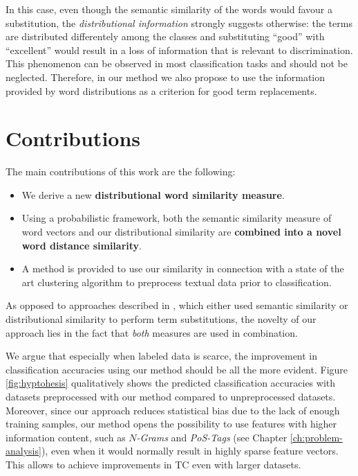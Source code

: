 In this case, even though the semantic similarity of the words would favour a
substitution, the \emph{distributional information} strongly suggests otherwise:
the terms are distributed differentely among the classes and substituting ``good'' with
``excellent'' would result in a loss of information that is relevant to 
discrimination. 
This phenomenon can be observed in most classification tasks and
should not be neglected. Therefore, in our method we also propose to use 
the information provided by word distributions as a criterion for good term 
replacements. 

\section{Contributions}
\label{sec:contributions}
The main contributions of this work are the following:

\begin{itemize}
  \item We derive a new \textbf{distributional word similarity measure}.
   
  \item Using a probabilistic framework, both the semantic similarity
  measure of word vectors and our distributional similarity are \textbf{combined into a novel
  word distance similarity}.
  
  \item A method is provided to use our similarity in connection with a state of
  the art clustering algorithm to preprocess textual data prior to
  classification.
\end{itemize}

As opposed to approaches described in \cite{baker1998distributional}, which
either used semantic similarity or distributional similarity to perform term substitutions, 
the novelty of our approach lies in the fact that \emph{both} measures are used in
combination. 

We argue that especially when labeled data is scarce, the
improvement in classification accuracies using our method should be all the more evident. Figure
\ref{fig:hyptohesis} qualitatively shows the predicted classification accuracies with datasets preprocessed 
with our method compared to unpreprocessed datasets. Moreover, since our
approach reduces statistical bias due to the lack of enough training samples, our method opens
the possibility to use features with higher information content, such as \emph{$N$-Grams} 
and \emph{PoS-Tags} (see Chapter \ref{ch:problem-analysis}), even when it would normally result in 
highly sparse feature vectors. This allows to achieve improvements in TC even
with larger datasets.

